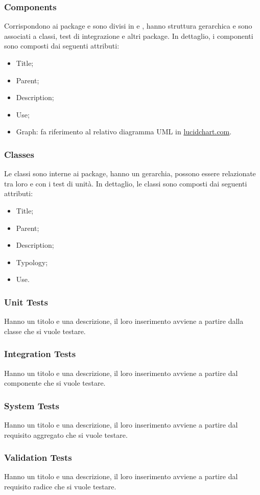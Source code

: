      \subsubsection{Components}
	Corrispondono ai package e sono divisi in  e , hanno struttura gerarchica e sono associati a classi, test di integrazione e altri package. 
     In dettaglio, i componenti sono composti dai seguenti attributi:
	\begin{itemize}
		\item Title;
		\item Parent;
		\item Description;
		\item Use;
		\item Graph: fa riferimento al relativo diagramma UML in \url{lucidchart.com}.
	\end{itemize}	     
     
    \subsubsection{Classes}
	Le classi sono interne ai package, hanno un gerarchia, possono essere relazionate tra loro e con i test di unità.
	In dettaglio, le classi sono composti dai seguenti attributi:
	\begin{itemize}
		\item Title;
		\item Parent;
		\item Description;
		\item Typology;
		\item Use.
	\end{itemize}		
	
     
     \subsubsection{Unit Tests}
     Hanno un titolo e una descrizione, il loro inserimento avviene a partire dalla classe che si vuole testare.
     
     \subsubsection{Integration Tests}
     Hanno un titolo e una descrizione, il loro inserimento avviene a partire dal componente che si vuole testare.
     
     \subsubsection{System Tests}
	 Hanno un titolo e una descrizione, il loro inserimento avviene a partire dal requisito aggregato che si vuole testare.
     
     \subsubsection{Validation Tests}
	 Hanno un titolo e una descrizione, il loro inserimento avviene a partire dal requisito radice che si vuole testare.     
     
